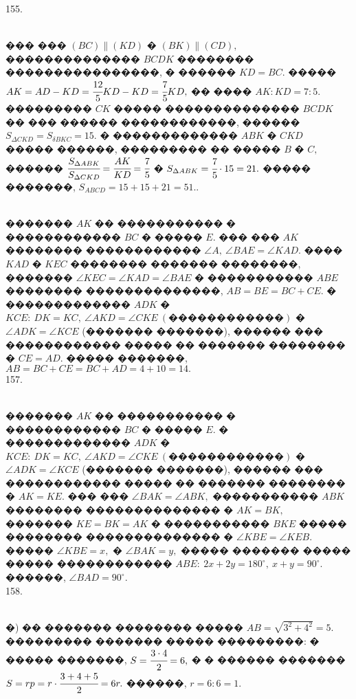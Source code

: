 \documentclass[12pt]{article}
\begin{document}
155. \begin{figure}[ht!]
\end{figure}\\
��� ��� $(BC)\parallel (KD)$ � $(BK)\parallel(CD),$ �������������� $BCDK$ �������� ����������������, � ������ $KD=BC.$ ����� $AK=AD-KD=\cfrac{12}{5}KD-KD=\cfrac{7}{5}KD,$ �� ���� $AK:KD=7:5.$ ��������� $CK$ ����� �������������� $BCDK$ �� ��� ������ ������������, ������ $S_{\Delta CKD}=S_{\delta BKC}=15.$ � ������������� $ABK$ � $CKD$ ����� ������, ��������� �� ����� $B$ � $C,$ ������ $\cfrac{S_{\Delta ABK}}{S_{\Delta CKD}}=\cfrac{AK}{KD}=\cfrac{7}{5}$ � $S_{\Delta ABK}=\cfrac{7}{5}\cdot15=21.$ ����� �������, $S_{ABCD}=15+15+21=51.$\newpage{}. \begin{figure}[ht!]
\end{figure}\\
������� $AK$ �� ����������� � ������������ $BC$ � ����� $E.$ ��� ��� $AK$ �������� ������������ $\angle A,\ \angle BAE=\angle KAD.$ ���� $KAD$ � $KEC$ �������� ������� ��������, ������� $\angle KEC=\angle KAD=\angle BAE$ � ����������� $ABE$ �������� ��������������, $AB=BE=BC+CE.$ � ������������� $ADK$ � $KCE:\ DK=KC,\ \angle AKD=\angle CKE\ (\text{������������})$ � $\angle ADK=\angle KCE$ (������� �������), ������ ��� ������������ ����� �� ������� �������� � $CE=AD.$ ����� �������, $AB=BC+CE=BC+AD=4+10=14.$\\
157. \begin{figure}[ht!]
\end{figure}\\
������� $AK$ �� ����������� � ������������ $BC$ � ����� $E.$  � ������������� $ADK$ � $KCE:\ DK=KC,\ \angle AKD=\angle CKE\ (\text{������������})$ � $\angle ADK=\angle KCE$ (������� �������), ������ ��� ������������ ����� �� ������� �������� � $AK=KE.$ ��� ��� $\angle BAK=\angle ABK,$ ����������� $ABK$ �������� �������������� � $AK=BK,$ ������� $KE=BK=AK$ � ����������� $BKE$ ����� �������� �������������� �  $\angle KBE=\angle KEB.$ ����� $\angle KBE=x,$ � $\angle BAK=y,$ ����� ������� ����� ����� ������������ $ABE:\ 2x+2y=180^\circ,\ x+y=90^\circ.$ ������, $\angle BAD=90^\circ.$\\
158. \begin{figure}[ht!]
\end{figure}\\
�) �� ������� �������� ����� $AB=\sqrt{3^2+4^2}=5.$ ��������� ������� ����� ���������: � ����� �������, $S=\cfrac{3\cdot4}{2}=6,$ � � ������ ������� $S=rp=r\cdot\cfrac{3+4+5}{2}=6r.$ ������, $r=6:6=1.$\\
\end{document}
